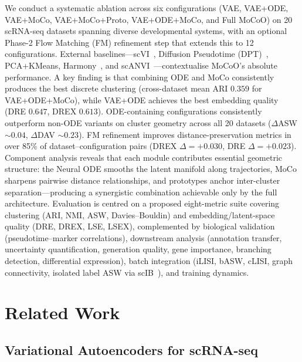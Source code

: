 \documentclass[biology,article,submit,pdftex]{Definitions/mdpi}
\begin{document}
We conduct a systematic ablation across six configurations (VAE, VAE+ODE, VAE+MoCo, VAE+MoCo+Proto, VAE+ODE+MoCo, and Full MoCoO) on 20 scRNA-seq datasets spanning diverse developmental systems, with an optional Phase-2 Flow Matching (FM) refinement step that extends this to 12 configurations. External baselines---scVI~\cite{lopez2018deep}, Diffusion Pseudotime (DPT)~\cite{haghverdi2016dpt}, PCA+KMeans, Harmony~\cite{korsunsky2019harmony}, and scANVI~\cite{xu2021probabilistic}---contextualise MoCoO's absolute performance. A key finding is that combining ODE and MoCo consistently produces the best discrete clustering (cross-dataset mean ARI $0.359$ for VAE+ODE+MoCo), while VAE+ODE achieves the best embedding quality (DRE $0.647$, DREX $0.613$). ODE-containing configurations consistently outperform non-ODE variants on cluster geometry across all 20 datasets ($\Delta$ASW ${\sim}0.04$, $\Delta$DAV ${\sim}0.23$). FM refinement improves distance-preservation metrics in over 85\% of dataset--configuration pairs (DREX $\Delta{=}+0.030$, DRE $\Delta{=}+0.023$). Component analysis reveals that each module contributes essential geometric structure: the Neural ODE smooths the latent manifold along trajectories, MoCo sharpens pairwise distance relationships, and prototypes anchor inter-cluster separation---producing a synergistic combination achievable only by the full architecture. Evaluation is centred on a proposed eight-metric suite covering clustering (ARI, NMI, ASW, Davies--Bouldin) and embedding/latent-space quality (DRE, DREX, LSE, LSEX), complemented by biological validation (pseudotime--marker correlations), downstream analysis (annotation transfer, uncertainty quantification, generation quality, gene importance, branching detection, differential expression), batch integration (iLISI, bASW, cLISI, graph connectivity, isolated label ASW via scIB~\cite{luecken2022scib}), and training dynamics.

\section{Related Work}
\label{sec:related}

\subsection{Variational Autoencoders for scRNA-seq}
\label{sec:related:vae}
\end{document}
